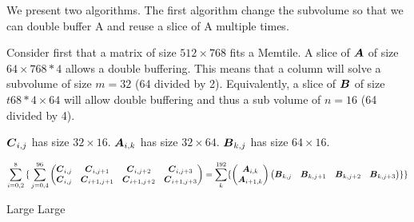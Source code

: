 \documentclass[conference]{IEEEtran}
\begin{document}
We present two algorithms. The first algorithm change the subvolume so
that we can double buffer A and reuse a slice of A multiple times.

Consider first that a matrix of size $512 \times 768$ fits a Memtile.
A slice of ${\boldsymbol A}$ of size $64 \times 768*4$ allows a double
buffering. This means that a column will solve a subvolume of size
$m=32$ (64 divided by 2). Equivalently, a slice of ${\boldsymbol B}$ of size
$t68*4 \times 64$ will allow double buffering and thus a sub volume of
$n=16$ (64 divided by 4). 

${\boldsymbol C}_{i,j}$ has size $32 \times 16$.   ${\boldsymbol A}_{i,k}$ has size $32 \times 64$. ${\boldsymbol B}_{k,j}$ has size $64 \times 16$.      

{\small \begin{equation*}
    \sum_{i=0,2}^{8}
    { \{} \sum_{j=0,4}^{96}
  \begin{pmatrix}
    {\boldsymbol C}_{i,j}  & {\boldsymbol C}_{i,j+1}    & {\boldsymbol C}_{i,j+2}    &{\boldsymbol C}_{i,j+3} \\
    {\boldsymbol C}_{i,j}  & {\boldsymbol C}_{i+1,j+1}   & {\boldsymbol C}_{i+1,j+2}  & {\boldsymbol C}_{i+1,j+3} \\
  \end{pmatrix}    = \sum_k^{192}
  \{
  \begin{pmatrix}
    {\boldsymbol A}_{i,k}  \\
    {\boldsymbol A}_{i+1,k}   \\
  \end{pmatrix}  
  \begin{pmatrix}
    {\boldsymbol B}_{k,j}  &  {\boldsymbol B}_{k,j+1}  & {\boldsymbol B}_{k,j+2}  &{\boldsymbol B}_{k,j+3} \\
  \end{pmatrix}
  \}
  { \}}    
\end{equation*}
}

\begin{algorithm}
  \caption{Large Large}
  \label{alg:one2}
  \begin{algorithmic}[1]
      \ENDFOR
    \ENDFOR
  \end{algorithmic}  
\end{algorithm}
\end{document}
